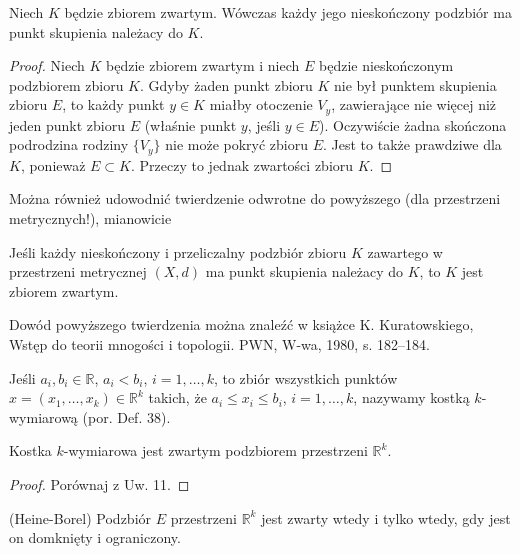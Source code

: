 \documentclass[leqno]{article}
\begin{document}
\begin{justify}
\begin{theorem}
{
    Niech $K$ będzie zbiorem zwartym. Wówczas każdy jego nieskończony podzbiór ma punkt skupienia należacy do $K$.
}
\end{theorem}

\begin{proof}
    Niech $K$ będzie zbiorem zwartym i niech $E$ będzie nieskończonym podzbiorem zbioru $K$.
    Gdyby żaden punkt zbioru $K$ nie był punktem skupienia zbioru $E$, to każdy punkt $y \in K$ miałby otoczenie $V_y$, zawierające nie więcej niż jeden punkt zbioru $E$
    (właśnie punkt $y$, jeśli $y \in E$). Oczywiście żadna skończona podrodzina rodziny $\{V_y\}$
    nie może pokryć zbioru $E$. Jest to także prawdziwe dla $K$, ponieważ $E \subset K$.
    Przeczy to jednak zwartości zbioru $K$.
\end{proof}

Można również udowodnić twierdzenie odwrotne do powyższego (dla przestrzeni metrycznych!), mianowicie

\begin{theorem}
{
    Jeśli każdy nieskończony i przeliczalny podzbiór zbioru $K$ zawartego w przestrzeni metrycznej $(X, d)$ ma punkt skupienia należacy do $K$, to $K$ jest zbiorem zwartym.
}
\end{theorem}

Dowód powyższego twierdzenia można znaleźć w książce K. Kuratowskiego, Wstęp do teorii mnogości i topologii. PWN, W-wa, 1980, s. 182--184.

\begin{defn}
    Jeśli $a_i, b_i \in \mathbb{R}$, $a_i < b_i$, $i = 1, \ldots, k$, to zbiór wszystkich punktów $x = (x_1, \ldots, x_k) \in \mathbb{R}^k$
    takich, że $a_i \leqslant x_i \leqslant b_i$, $i = 1, \ldots, k$, nazywamy kostką $k$-wymiarową (por. Def. 38).
\end{defn}

\begin{theorem}
{
    Kostka $k$-wymiarowa jest zwartym podzbiorem przestrzeni $\mathbb{R}^k$.
}
\end{theorem}

\begin{proof}
    Porównaj z Uw. 11.
\end{proof}

\begin{theorem}
{
    (Heine-Borel) Podzbiór $E$ przestrzeni $\mathbb{R}^k$ jest zwarty wtedy i tylko wtedy, gdy jest on domknięty i ograniczony.
}
\end{theorem}


\end{justify}
\end{document}
